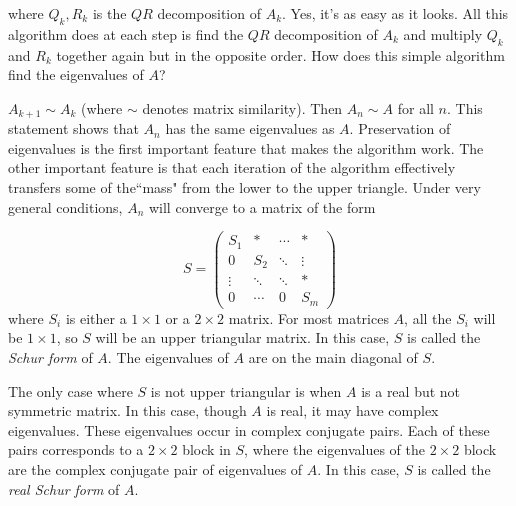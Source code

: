 where $Q_k, R_k$ is the $QR$ decomposition of $A_k$. Yes, it's as easy as it looks. All this algorithm does at each step is find the $QR$ decomposition of $A_k$ and multiply $Q_k$ and $R_k$ together again but in the opposite order. How does this simple algorithm find the eigenvalues of $A$? 

  

\begin{comment}
\begin{problem}
\label{problem:similarity proof}
Prove that $A_{k+1} \sim A_k$ (where $\sim$ denotes matrix similarity). Then prove that $A_n \sim A$ for all $n$.  
\end{problem}
\end{comment}

$A_{k+1} \sim A_k$ (where $\sim$ denotes matrix similarity). Then $A_n \sim A$ for all $n$. This statement shows that $A_n$ has the same eigenvalues as $A$. Preservation of eigenvalues is the first important feature that makes the algorithm work. The other important feature is that each iteration of the algorithm effectively transfers some of the``mass" from the lower to the upper triangle. Under very general conditions, $A_n$ will converge to a matrix of the form

\begin{equation*}
\label{eq:Schur form}
S = 
     \begin{pmatrix}
          S_1 &* & \cdots & * \\
           0     &S_2  &  \ddots & \vdots \\
           \vdots  & \ddots & \ddots & *  \\
           0 & \cdots & 0 & S_m
    \end{pmatrix}
\end{equation*}
where $S_i$ is either a $1 \times 1$ or a $2 \times 2$ matrix. For most matrices $A$, all the $S_i$ will be $1 \times 1$, so $S$ will be an upper triangular matrix. In this case, $S$ is called the \emph{Schur form} of $A$. The eigenvalues of $A$ are on the main diagonal of $S$.

The only case where $S$ is not upper triangular is when $A$ is a real but not symmetric matrix. In this case, though $A$ is real, it may have complex eigenvalues. These eigenvalues occur in complex conjugate pairs. Each of these pairs corresponds to a $2 \times 2$ block in $S$, where the eigenvalues of the $2 \times 2$ block are the complex conjugate pair of eigenvalues of $A$. In this case, $S$ is called the \emph{real Schur form} of $A$.

